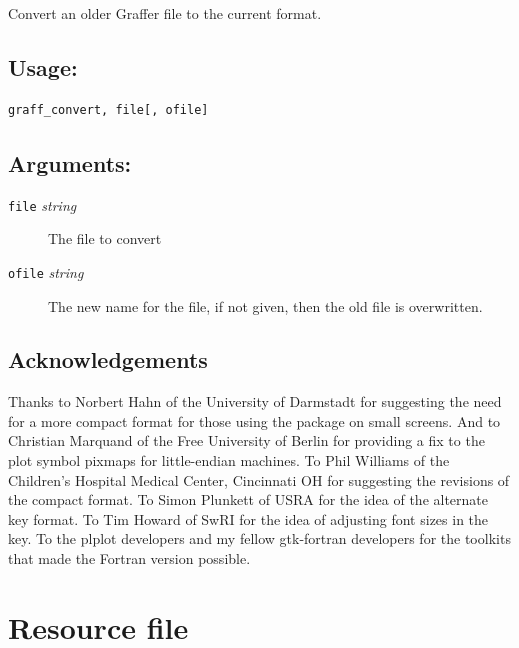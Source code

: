 \documentclass[11pt,twoside,english]{article}
\begin{document}
Convert an older Graffer file to the current format.

\subsection{Usage:}
\label{sec:gr_c_use}
        
\begin{verbatim}
graff_convert, file[, ofile]
\end{verbatim}

\subsection{Arguments:}
\label{sec:gr_c_args}

\begin{description}
\item[\texttt{file} \textit{string}] The file to convert
\item [\texttt{ofile} \textit{string}] The new name for the file, if
  not given, then the old file is overwritten.
\end{description}


\subsection*{Acknowledgements}

Thanks to Norbert Hahn of the University of Darmstadt for suggesting
the need for a more compact format for those using the package on small
screens. And to Christian Marquand of the Free University of Berlin for
providing a fix to the plot symbol pixmaps for little-endian
machines. To Phil Williams of the Children's Hospital Medical Center,
Cincinnati OH for suggesting the revisions of the compact format. To
Simon Plunkett of USRA for the idea of the alternate key format. To Tim
Howard of SwRI for the idea of adjusting font sizes in the key. To the
plplot developers and my fellow gtk-fortran developers for the toolkits
that made the Fortran version possible.

\appendix

\section{Resource file}
\label{sec:grafferrc}
\end{document}
